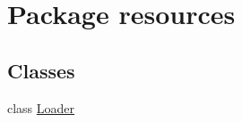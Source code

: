 \hypertarget{namespaceresources}{}\section{Package resources}
\label{namespaceresources}
\subsection*{Classes}
\begin{DoxyCompactItemize}
\item 
class \hyperlink{classresources_1_1Loader}{Loader}
\end{DoxyCompactItemize}
